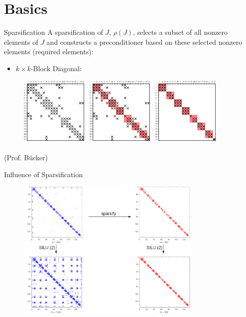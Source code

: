 \documentclass{beamer}
\newcommand{\sparsifysymbol}{\ensuremath{\rho}}
\newcommand{\sparsify}[1]{\ensuremath{\sparsifysymbol(#1)}}
\begin{document}
\section{Basics}
\begin{frame}{Sparsification}
A sparsification of $J$, \sparsify{J}, selects a 
subset of all nonzero elements of $J$ and constructs a
preconditioner based on these selected nonzero elements (required elements):
\begin{itemize}
\item $k\times k$-Block Diagonal:
\end{itemize}
\begin{figure}
\centering
\includegraphics[width=0.3\textwidth]{mat}
\includegraphics[width=0.3\textwidth]{mat_sparsify}
\includegraphics[width=0.3\textwidth]{mat_sparsify_removed}
\end{figure}
(Prof. B{\"u}cker)
\end{frame}

\begin{frame}{Influence of Sparsification}
\begin{figure}
\centering
\includegraphics[width=0.8\textwidth]{sparsify}
\end{figure}
\end{frame}
\end{document}

